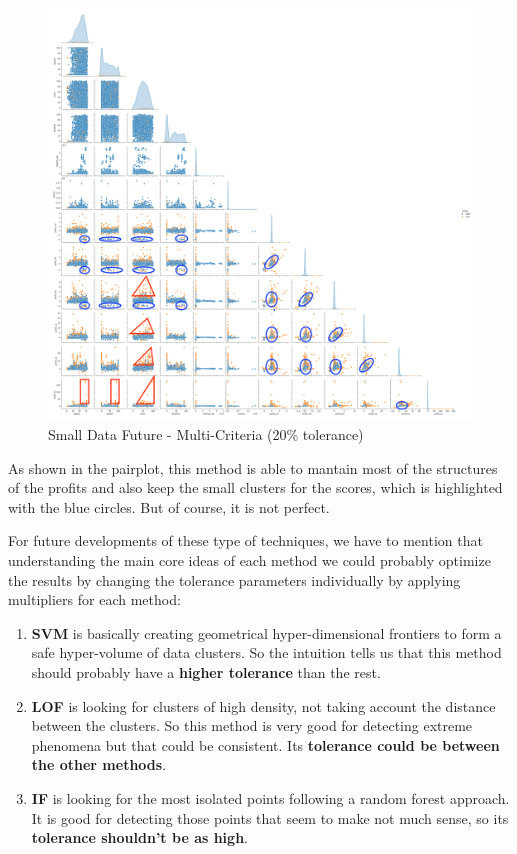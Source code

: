 \documentclass[11pt,english,a4paper,hidelinks]{book}
\begin{document}
\begin{figure}[H]
    \centering
    \includegraphics[width=1\textwidth]{images/code/outliers/Small Data future - Multi.png}
    \caption{Small Data Future - Multi-Criteria (20\% tolerance)}
    \label{fig:small_data_future_multi}
\end{figure}

\noindent As shown in the pairplot, this method is able to mantain most of the structures of the profits and also keep the small clusters for the scores, which is highlighted with the blue circles. But of course, it is not perfect. 

\vspace{0.5cm}
\noindent For future developments of these type of techniques, we have to mention that understanding the main core ideas of each method we could probably optimize the results by changing the tolerance parameters individually by applying multipliers for each method:
\begin{enumerate}
    \item \textbf{SVM} is basically creating geometrical hyper-dimensional frontiers to form a safe hyper-volume of data clusters. So the intuition tells us that this method should probably have a \textbf{higher tolerance} than the rest.
    \item \textbf{LOF} is looking for clusters of high density, not taking account the distance between the clusters. So this method is very good for detecting extreme phenomena but that could be consistent. Its \textbf{tolerance could be between the other methods}.
    \item \textbf{IF} is looking for the most isolated points following a random forest approach. It is good for detecting those points that seem to make not much sense, so its \textbf{tolerance shouldn't be as high}.
\end{enumerate}
\end{document}
